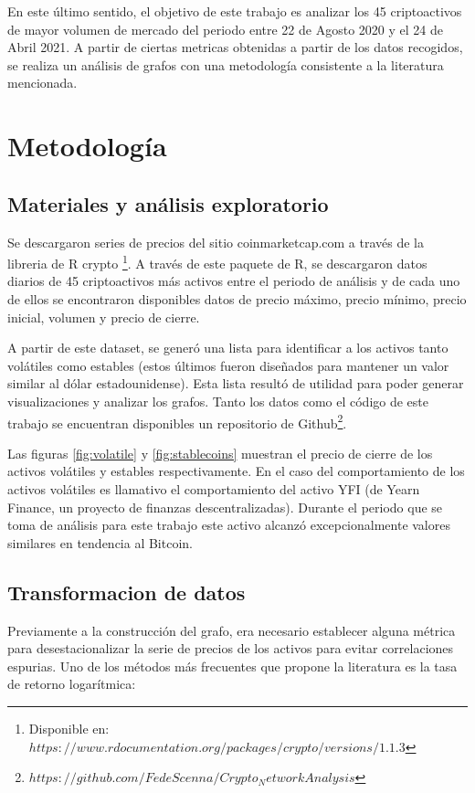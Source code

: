 \documentclass[runningheads,legalpaper,10pt]{etc/llncs}
\let\stdsection\section
\renewcommand\section{\newpage\stdsection}
\begin{document}
En este último sentido, el objetivo de este trabajo es analizar los 45 criptoactivos de mayor volumen de mercado del periodo entre 22 de Agosto 2020 y el 24 de Abril 2021. A partir de ciertas metricas obtenidas a partir de los datos recogidos, se realiza un análisis de grafos con una metodología consistente a la literatura mencionada.

\section{Metodología}

\subsection{Materiales y análisis exploratorio}
 Se descargaron
series de precios del sitio coinmarketcap.com a través de la libreria de R crypto \footnote{Disponible en: $https://www.rdocumentation.org/packages/crypto/versions/1.1.3$}. A través de este paquete de R, se descargaron datos diarios de 45 criptoactivos más activos entre el periodo de análisis y de cada uno de ellos se encontraron disponibles datos de precio máximo, precio mínimo, precio inicial, volumen y precio de cierre.


A partir de este dataset, se generó una lista para identificar a los activos tanto volátiles como estables (estos últimos fueron diseñados para mantener un valor similar al dólar estadounidense). Esta lista resultó de utilidad para poder generar visualizaciones y analizar los grafos.
Tanto los datos como el código de este trabajo se encuentran disponibles un repositorio de Github\footnote{$https://github.com/FedeScenna/Crypto_NetworkAnalysis$}.

Las figuras \ref{fig:volatile} y \ref{fig:stablecoins} muestran el precio de cierre de los activos volátiles y estables respectivamente.  En el caso del comportamiento de los activos volátiles es llamativo el comportamiento del activo YFI (de Yearn Finance, un proyecto de finanzas descentralizadas). Durante el periodo que se toma de análisis para este trabajo este activo alcanzó excepcionalmente valores similares en tendencia al Bitcoin.

\subsection{Transformacion de datos}

Previamente a la construcción del grafo, era necesario establecer alguna métrica para desestacionalizar la serie de precios de los activos para evitar correlaciones espurias. Uno de los métodos más frecuentes que propone la literatura \cite{cryptonetwork} es la tasa de retorno logarítmica:
\end{document}
